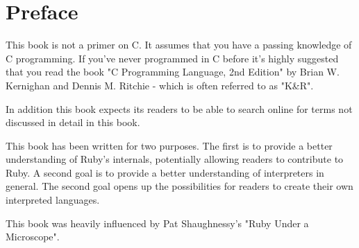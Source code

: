 \chapter*{Preface}

This book is not a primer on C. It assumes that you have a passing knowledge of C programming. If you've never programmed in C before it's highly suggested that you read the book "C Programming Language, 2nd Edition" by Brian W. Kernighan and Dennis M. Ritchie -  which is often referred to as "K\&R".

In addition this book expects its readers to be able to search online for terms not discussed in detail in this book.

This book has been written for two purposes. The first is to provide a better understanding of Ruby's internals, potentially allowing readers to contribute to Ruby. A second goal is to provide a better understanding of interpreters in general. The second goal opens up the possibilities for readers to create their own interpreted languages.

This book was heavily influenced by Pat Shaughnessy's "Ruby Under a Microscope".
